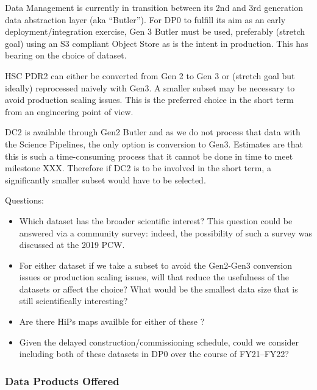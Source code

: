 Data Management is currently in transition between its 2nd and 3rd generation data abstraction layer (aka ``Butler''). For DP0 to fulfill its aim as an early deployment/integration exercise, Gen 3 Butler must be used, preferably (stretch goal) using an S3 compliant Object Store as is the intent in production. This has bearing on the choice of dataset.

HSC PDR2 can either be converted from Gen 2 to Gen 3 or (stretch goal but ideally) reprocessed naively with Gen3. A smaller subset may be necessary to avoid production scaling issues. This is the preferred choice in the short term from an engineering point of view.

DC2 is available through Gen2 Butler and as we do not process that data with the Science Pipelines, the only option is conversion to Gen3. Estimates are that this is such a time-consuming process that it cannot be done in time to meet milestone XXX. Therefore if DC2 is to be involved in the short term, a significantly smaller subset would have to be selected.

Questions:

\begin{itemize}

\item Which dataset has the broader scientific interest? This question could be answered via a community survey: indeed, the possibility of such a survey was discussed at the 2019 PCW.

\item For either dataset if we take a subset to avoid the Gen2-Gen3 conversion issues or production scaling issues, will that reduce the usefulness of the datasets or affect the choice? What would be the smallest data size that is still scientifically interesting?

\item Are there HiPs maps availble for either of these ?


\item Given the delayed construction/commissioning schedule, could we consider including both of these datasets in DP0 over the course of FY21--FY22?

\end{itemize}

\subsubsection{Data Products Offered}


